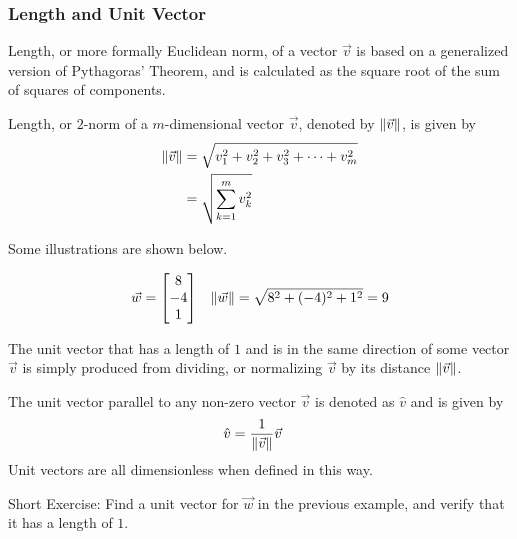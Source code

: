 \subsubsection{Length and Unit Vector} Length, or more formally Euclidean norm, of a vector $\vec{v}$ is based on a generalized version of Pythagoras’ Theorem, and is calculated as the square root of the sum of squares of components.
\begin{defn}
\label{vectorlength}
Length, or $2$-norm of a $m$-dimensional vector $\vec{v}$, denoted by $\norm{\vec{v}}$, is given by
\begin{align*}
\norm{\vec{v}} &= \sqrt{v_1^2 + v_2^2 + v_3^2 + \cdots + v_m^2} \\
&= \sqrt{\sum_{k=1}^{m} v_k^2}
\end{align*}
\end{defn}
Some illustrations are shown below.
\begin{center}
\end{center}
\begin{align*}
&\vec{w} = 
\begin{bmatrix}
8 \\
-4 \\
1
\end{bmatrix}
& \norm{\vec{w}}=
\sqrt{8^2 + (-4)^2 + 1^2} = 9 
\end{align*}

The unit vector that has a length of $1$ and is in the same direction of some vector $\vec{v}$ is simply produced from dividing, or normalizing $\vec{v}$ by its distance $\norm{\vec{v}}$.
\begin{defn}
\label{unitvec}
The unit vector parallel to any non-zero vector $\vec{v}$ is denoted as $\hat{v}$ and is given by
\begin{align*}
\hat{v} &= \frac{1}{\norm{\vec{v}}}\vec{v}
\end{align*}
Unit vectors are all dimensionless when defined in this way.
\end{defn}
Short Exercise: Find a unit vector for $\vec{w}$ in the previous example, and verify that it has a length of $1$.

